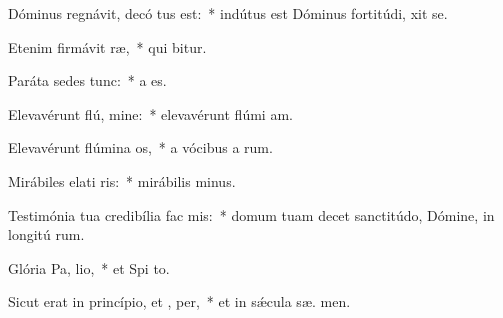\item Dóminus regnávit, decó tus est:~* indútus est Dóminus fortitúdi,  xit se.
\item Etenim firmávit  ræ,~* qui  bitur.
\item Paráta sedes   tunc:~* a   es.
\item Elevavérunt flú, mine:~* elevavérunt flúmi  am.
\item Elevavérunt flúmina  os,~* a vócibus a rum.
\item Mirábiles elati ris:~* mirábilis   minus.
\item Testimónia tua credibília fac  mis:~* domum tuam decet sanctitúdo, Dómine, in longitú rum.
\item Glória Pa,  lio,~* et Spi to.
\item Sicut erat in princípio, et ,  per,~* et in sǽcula sæ. men.
